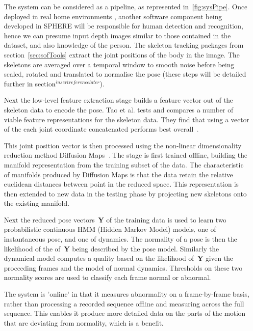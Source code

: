\documentclass[11pt]{article} %
\begin{document}
\begin{appendices}
The system can be considered as a pipeline, as represented in~\ref{fig:sysPipe}. Once deployed in real home environments , another software component being developed in SPHERE will be responsible for human detection and recognition, hence we can presume input depth images similar to those contained in the dataset, and also knowledge of the person. The skeleton tracking packages from section~\ref{sec:sofTools} extract the joint positions of the body in the image. The skeletons are averaged over a temporal window to smooth noise before being scaled, rotated and translated to normalise the pose (these steps will be detailed further in section$^{insert reference later}$).  

Next the low-level feature extraction stage builds a feature vector out of the skeleton data to encode the pose. Tao et al. tests and compares a number of viable feature representations for the skeleton data. They find that using a vector of the each joint coordinate concatenated performs best overall~\cite{Tao}. 

This joint position vector is then processed using the non-linear dimensionality reduction method Diffusion Maps~\cite{Coifman2006}. The stage is first trained offline, building the manifold representation from the training subset of the data. The characteristic of manifolds produced by Diffusion Maps is that the data retain the relative euclidean distances between point in the reduced space. This representation is then extended to new data in the testing phase by projecting new skeletons onto the existing manifold. 

Next the reduced pose vectors~\textbf{Y} of the training data is used to learn two probabilistic continuous HMM (Hidden Markov Model) models, one of instantaneous pose, and one of dynamics. The normality of a pose is then the likelihood of the of~\textbf{Y} being described by the pose model. Similarly the dynamical model computes a quality based on the likelihood of~\textbf{Y} given the proceeding frames and the model of normal dynamics. Thresholds on these two normality scores are used to classify each frame normal or abnormal.

The system is 'online' in that it measures abnormality on a frame-by-frame basis, rather than processing a recorded sequence offline and measuring across the full sequence. This enables it produce more detailed data on the parts of the motion that are deviating from normality, which is a benefit.
 
\end{appendices}
\end{document}
